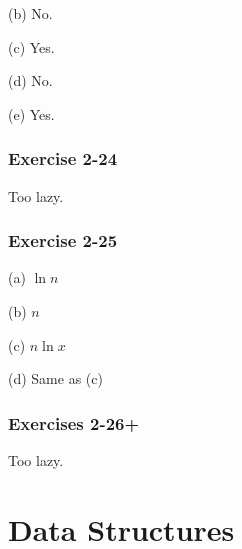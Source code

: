 \documentclass{book}
\begin{document}
\noindent
(b) No.

\noindent
(c) Yes.

\noindent
(d) No.

\noindent
(e) Yes.

\subsection*{Exercise 2-24}
Too lazy.

\subsection*{Exercise 2-25}
(a) $\ln n$

\noindent
(b) $n$

\noindent
(c) $n \ln x$

\noindent
(d) Same as (c)

\subsection*{Exercises 2-26+}
Too lazy.

\chapter{Data Structures}
\end{document}
